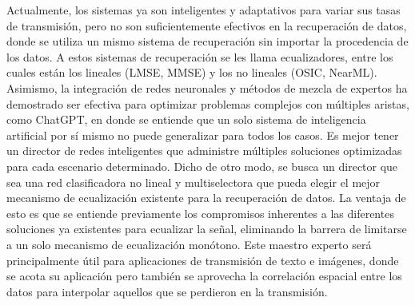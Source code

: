\documentclass{article}
\begin{document}
Actualmente, los sistemas ya son inteligentes y adaptativos para variar sus tasas de transmisión, 
pero no son suficientemente efectivos en la recuperación de datos, donde se utiliza un mismo sistema 
de recuperación sin importar la procedencia de los datos. A estos sistemas de recuperación se les llama ecualizadores, 
entre los cuales están los lineales (LMSE, MMSE) y los no lineales (OSIC, NearML). Asimismo, 
la integración de redes neuronales y métodos de mezcla de expertos ha demostrado ser efectiva para optimizar problemas complejos 
con múltiples aristas, como ChatGPT, en donde se entiende que un solo sistema de inteligencia artificial 
por sí mismo no puede generalizar para todos los casos. Es mejor tener un director de redes inteligentes 
que administre múltiples soluciones optimizadas para cada escenario determinado. Dicho de otro modo, 
se busca un director que sea una red clasificadora no lineal y multiselectora que pueda elegir el mejor mecanismo 
de ecualización existente para la recuperación de datos. La ventaja de esto es que se entiende previamente 
los compromisos inherentes a las diferentes soluciones ya existentes para ecualizar la señal, 
eliminando la barrera de limitarse a un solo mecanismo de ecualización monótono. 
Este maestro experto será principalmente útil para aplicaciones de transmisión de texto e imágenes, 
donde se acota su aplicación pero también se aprovecha la correlación espacial entre los datos para 
interpolar aquellos que se perdieron en la transmisión.



\end{document}
